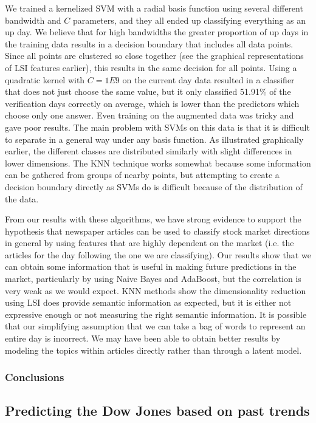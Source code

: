 \documentclass[10pt, twocolumn]{article}
\begin{document}
We trained a kernelized SVM with a radial basis function using several different bandwidth and $C$ parameters, and they all ended up classifying everything as an up day. We believe that for high bandwidths the greater proportion of up days in the training data results in a decision boundary that includes all data points. Since all points are clustered so close together (see the graphical representations of LSI features earlier), this results in the same decision for all points. Using a quadratic kernel with $C=1E9$ on the current day data resulted in a classifier that does not just choose the same value, but it only classified 51.91\% of the verification days correctly on average, which is lower than the predictors which choose only one answer. Even training on the augmented data was tricky and gave poor results. The main problem with SVMs on this data is that it is difficult to separate in a general way under any basis function. As illustrated graphically earlier, the different classes are distributed similarly with slight differences in lower dimensions. The KNN technique works somewhat because some information can be gathered from groups of nearby points, but attempting to create a decision boundary directly as SVMs do is difficult because of the distribution of the data.

From our results with these algorithms, we have strong evidence to support the hypothesis that newspaper articles can be used to classify stock market directions in general by using features that are highly dependent on the market (i.e. the articles for the day following the one we are classifying). Our results show that we can obtain some information that is useful in making future predictions in the market, particularly by using Naive Bayes and AdaBoost, but the correlation is very weak as we would expect. KNN methods show the dimensionality reduction using LSI does provide semantic information as expected, but it is either not expressive enough or not measuring the right semantic information. It is possible that our simplifying assumption that we can take a bag of words to represent an entire day is incorrect. We may have been able to obtain better results by modeling the topics within articles directly rather than through a latent model.

\subsubsection{Conclusions}

\subsection{Predicting the Dow Jones based on past trends}
\label{dj->dj}
\end{document}
